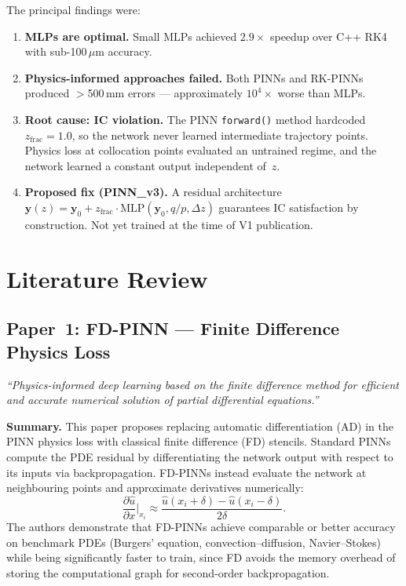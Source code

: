 \documentclass[12pt,a4paper]{article}
\newcommand{\vb}[1]{\bm{#1}}
\begin{document}
The principal findings were:
\begin{enumerate}
\item \textbf{MLPs are optimal.} Small MLPs achieved $2.9\times$ speedup over C++ RK4 with sub-100\,$\mu$m accuracy.
\item \textbf{Physics-informed approaches failed.} Both PINNs and RK-PINNs produced $>$500\,mm errors --- approximately $10^4\times$ worse than MLPs.
\item \textbf{Root cause: IC violation.} The PINN \texttt{forward()} method hardcoded $z_{\text{frac}} = 1.0$, so the network never learned intermediate trajectory points. Physics loss at collocation points evaluated an untrained regime, and the network learned a constant output independent of~$z$.
\item \textbf{Proposed fix (PINN\_v3).} A residual architecture $\vb{y}(z) = \vb{y}_0 + z_{\text{frac}} \cdot \text{MLP}(\vb{y}_0, q/p, \Delta z)$ guarantees IC satisfaction by construction. Not yet trained at the time of V1 publication.
\end{enumerate}

\section{Literature Review}
\label{sec:literature}

\subsection{Paper~1: FD-PINN --- Finite Difference Physics Loss}
\label{sec:paper1}

\textit{``Physics-informed deep learning based on the finite difference method for efficient and accurate numerical solution of partial differential equations.''}

\medskip
\noindent\textbf{Summary.} This paper proposes replacing automatic differentiation (AD) in the PINN physics loss with classical finite difference (FD) stencils. Standard PINNs compute the PDE residual by differentiating the network output with respect to its inputs via backpropagation. FD-PINNs instead evaluate the network at neighbouring points and approximate derivatives numerically:
\begin{equation}
\frac{\partial \hat{u}}{\partial x}\bigg|_{x_i} \approx \frac{\hat{u}(x_i + \delta) - \hat{u}(x_i - \delta)}{2\delta}.
\end{equation}
The authors demonstrate that FD-PINNs achieve comparable or better accuracy on benchmark PDEs (Burgers' equation, convection--diffusion, Navier--Stokes) while being significantly faster to train, since FD avoids the memory overhead of storing the computational graph for second-order backpropagation.
\end{document}
